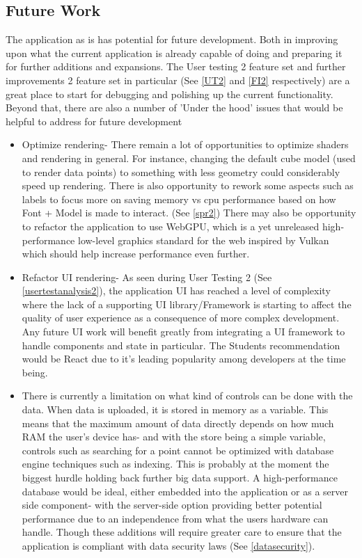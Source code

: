 \subsection{Future Work} \label{futurework}
The application as is has potential for future development. Both in improving upon what the current application is already capable of doing and preparing it for further additions and expansions. The User testing 2 feature set and further improvements 2 feature set in particular (See \ref{UT2} and \ref{FI2} respectively) are a great place to start for debugging and polishing up the current functionality. Beyond that, there are also a number of 'Under the hood' issues that would be helpful to address for future development
\begin{itemize}
    \item Optimize rendering- There remain a lot of opportunities to optimize shaders and rendering in general. For instance, changing the default cube model (used to render data points) to something with less geometry could considerably speed up rendering. There is also opportunity to rework some aspects such as labels to focus more on saving memory vs cpu performance based on how Font + Model is made to interact. (See \ref{spr2}) There may also be opportunity to refactor the application to use WebGPU, which is a yet unreleased high-performance low-level graphics standard for the web inspired by Vulkan which should help increase performance even further. \cite{w3c_2023_webgpu} \cite{mozilla_webgpu}
    \item Refactor UI rendering- As seen during User Testing 2 (See \ref{usertestanalysis2}), the application UI has reached a level of complexity where the lack of a supporting UI library/Framework is starting to affect the quality of user experience as a consequence of more complex development. Any future UI work will benefit greatly from integrating a UI framework to handle components and state in particular. The Students recommendation would be React due to it's leading popularity among developers at the time being. \cite[]{stackoverflow_2021_stack}
    \item There is currently a limitation on what kind of controls can be done with the data. When data is uploaded, it is stored in memory as a variable. This means that the maximum amount of data directly depends on how much RAM the user's device has- and with the store being a simple variable, controls such as searching for a point cannot be optimized with database engine techniques such as indexing. This is probably at the moment the biggest hurdle holding back further big data support. A high-performance database would be ideal, either embedded into the application or as a server side component- with the server-side option providing better potential performance due to an independence from what the users hardware can handle. Though these additions will require greater care to ensure that the application is compliant with data security laws (See \ref{datasecurity}).
\end{itemize}

